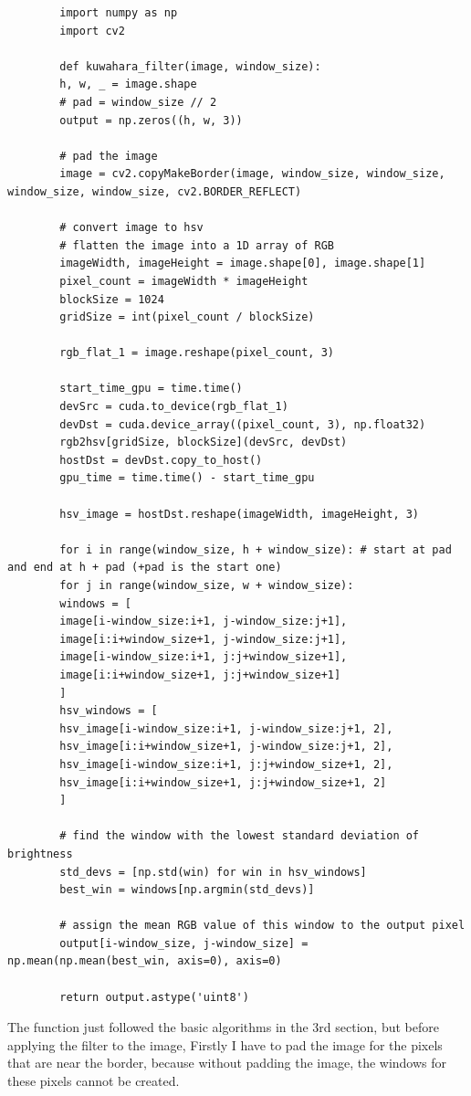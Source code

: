 \documentclass{article}
\begin{document}
	\begin{verbatim}
		import numpy as np
		import cv2
		
		def kuwahara_filter(image, window_size):
		h, w, _ = image.shape
		# pad = window_size // 2
		output = np.zeros((h, w, 3))
		
		# pad the image
		image = cv2.copyMakeBorder(image, window_size, window_size, window_size, window_size, cv2.BORDER_REFLECT)
		
		# convert image to hsv
		# flatten the image into a 1D array of RGB
		imageWidth, imageHeight = image.shape[0], image.shape[1]
		pixel_count = imageWidth * imageHeight
		blockSize = 1024
		gridSize = int(pixel_count / blockSize)
		
		rgb_flat_1 = image.reshape(pixel_count, 3)
		
		start_time_gpu = time.time()
		devSrc = cuda.to_device(rgb_flat_1)
		devDst = cuda.device_array((pixel_count, 3), np.float32)
		rgb2hsv[gridSize, blockSize](devSrc, devDst)
		hostDst = devDst.copy_to_host()
		gpu_time = time.time() - start_time_gpu
		
		hsv_image = hostDst.reshape(imageWidth, imageHeight, 3)
		
		for i in range(window_size, h + window_size): # start at pad and end at h + pad (+pad is the start one)
		for j in range(window_size, w + window_size):
		windows = [
		image[i-window_size:i+1, j-window_size:j+1],
		image[i:i+window_size+1, j-window_size:j+1],
		image[i-window_size:i+1, j:j+window_size+1],
		image[i:i+window_size+1, j:j+window_size+1]
		]
		hsv_windows = [
		hsv_image[i-window_size:i+1, j-window_size:j+1, 2],
		hsv_image[i:i+window_size+1, j-window_size:j+1, 2],
		hsv_image[i-window_size:i+1, j:j+window_size+1, 2],
		hsv_image[i:i+window_size+1, j:j+window_size+1, 2]
		]
		
		# find the window with the lowest standard deviation of brightness
		std_devs = [np.std(win) for win in hsv_windows]
		best_win = windows[np.argmin(std_devs)]
		
		# assign the mean RGB value of this window to the output pixel
		output[i-window_size, j-window_size] = np.mean(np.mean(best_win, axis=0), axis=0)
		
		return output.astype('uint8')
	\end{verbatim}
	
	The function just followed the basic algorithms in the 3rd section, but before applying the filter to the image, Firstly I have to pad the image for the pixels that are near the border, because without padding the image, the windows for these pixels cannot be created.
	
\end{document}
